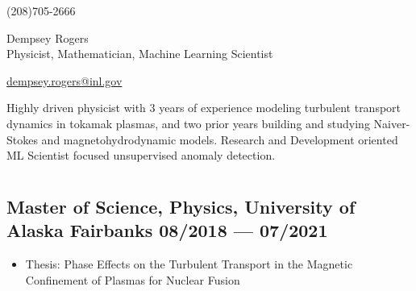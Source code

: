 \documentclass[letterpaper,11pt]{article}
\begin{document}
\begin{center}
    \begin{minipage}[b]{0.24\textwidth}
            \large (208)705-2666 
    \end{minipage}%
    \begin{minipage}[b]{0.5\textwidth}
            \centering
            {\Huge Dempsey Rogers} \\ %
            \vspace{0.1cm}
            {\color{cvblue} \Large{Physicist, Mathematician, Machine Learning Scientist}} \\
    \end{minipage}%
    \begin{minipage}[b]{0.24\textwidth}
            {\href{mailto:dempsey.rogers@inl.gov}{dempsey.rogers@inl.gov} } 
    \end{minipage}   
    
\vspace{-0.15cm} 
{\color{cvblue} \hrulefill}
\end{center}
\vspace{-0.2cm}
Highly driven physicist with 3 years of experience modeling turbulent transport dynamics in tokamak plasmas, and two prior years building and studying Naiver-Stokes and magnetohydrodynamic models. Research and Development oriented ML Scientist focused unsupervised anomaly detection. %

\vspace{-0.2cm}


\section{\color{cvblue}{Education} }
\subsection*{{\color{cvblue}Master of Science, Physics,} {\normalsize \normalfont University of Alaska Fairbanks} \hfill 08/2018 --- 07/2021} \vspace{-.1in}
\begin{itemize}
\item Thesis: Phase Effects on the Turbulent Transport in the Magnetic Confinement of Plasmas for Nuclear Fusion
\end{itemize}
\end{document}
